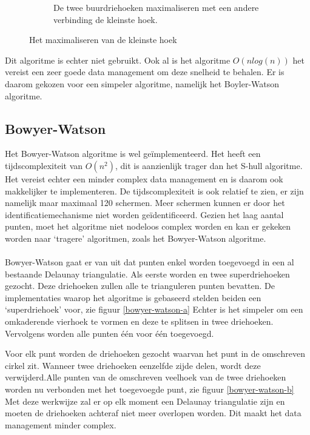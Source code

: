 \begin{figure}
\begin{subfigure}{0.4\textwidth}
		\caption{De twee buurdriehoeken maximaliseren met een andere verbinding de kleinste hoek.}
	\end{subfigure}
	\caption{Het maximaliseren van de kleinste hoek \cite{delaunaywiki}}
	\label{driehoekswitch}
\end{figure}

Dit algoritme is echter niet gebruikt. Ook al is het algoritme $O(nlog(n))$ het vereist een zeer goede data management om deze snelheid te behalen.  \cite{Lund2014} Er is daarom gekozen voor een simpeler algoritme, namelijk het Boyler-Watson algoritme.

\subsection{Bowyer-Watson}
Het Bowyer-Watson algoritme is wel geïmplementeerd. Het heeft een tijdscomplexiteit van $O(n^2)$, dit is aanzienlijk trager dan het S-hull algoritme. \cite{Bowyer-WatsonWiki} Het vereist echter een minder complex data management en is daarom ook makkelijker te implementeren. De tijdscomplexiteit is ook relatief te zien, er zijn namelijk maar maximaal 120 schermen. Meer schermen kunnen er door het identificatiemechanisme niet worden geïdentificeerd. Gezien het laag aantal punten, moet het algoritme niet nodeloos complex worden en kan er gekeken worden naar `tragere' algoritmen, zoals het Bowyer-Watson algoritme.

\paragraph{}
Bowyer-Watson gaat er van uit dat punten enkel worden toegevoegd in een al bestaande Delaunay triangulatie. Als eerste worden en twee superdriehoeken gezocht. Deze driehoeken zullen alle te trianguleren punten bevatten. De implementaties waarop het algoritme is gebaseerd \cite{Bowyer-WatsonWiki} \cite{bowyer-watsonImplementation} stelden beiden een `superdriehoek' voor, zie figuur \ref{bowyer-watson-a} Echter is het simpeler om een omkaderende vierhoek te vormen en deze te splitsen in twee driehoeken. Vervolgens worden alle punten één voor één toegevoegd.

Voor elk punt worden de driehoeken gezocht waarvan het punt in de omschreven cirkel zit. Wanneer twee driehoeken eenzelfde zijde delen, wordt deze verwijderd.Alle punten van de omschreven veelhoek van de twee driehoeken worden nu verbonden met het toegevoegde punt, zie figuur \ref{bowyer-watson-b} Met deze werkwijze zal er op elk moment een Delaunay triangulatie zijn en moeten de driehoeken achteraf niet meer overlopen worden. Dit maakt het data management minder complex.

